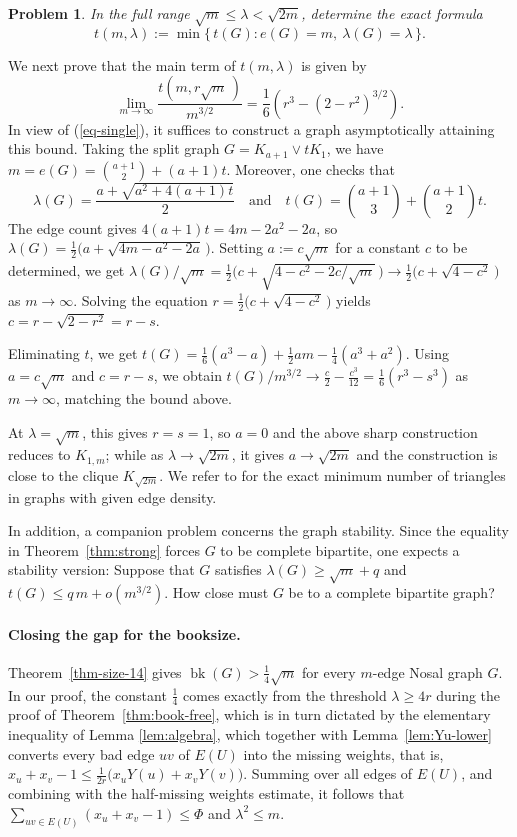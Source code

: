 \documentclass[11pt,a4paper]{article}
\newtheorem{problem}[theorem]{Problem}
\theoremstyle{definition}
\theoremstyle{plain}
\newcommand{\bk}{\operatorname{bk}}
\renewcommand{\le}{\leqslant}
\renewcommand{\ge}{\geqslant}
\begin{document}
\begin{problem}
In the full range $\sqrt m\le\lambda<\sqrt{2m}$,
determine the exact formula
\[
   t(m,\lambda):=\min\bigl\{\,t(G):e(G)=m,\
   \lambda(G)=\lambda\,\bigr\}.
\]
\end{problem}

We next prove that the main term of $t(m,\lambda)$ is given by  
\[
   \lim_{m\to\infty}\frac{t(m,r\sqrt m\,)}{m^{3/2}}
   =\frac16 \left(r^3-(2-r^2)^{3/2}\right).
\] 
In view of (\ref{eq-single}), 
it suffices to construct a graph asymptotically
 attaining this bound. 
Taking the split graph $G=K_{a+1}\vee tK_1$, we have $m=e(G)=\binom{a+1}{2}+(a+1)t$. Moreover, 
one checks that 
\[
  \lambda (G)=\frac{a+\sqrt{a^2+4(a+1)t}}{2}\quad \text{and} \quad 
  t(G)=\binom{a\!+\!1}{3}+\binom{a\!+\!1}{2}t.
\]
The edge count gives
$4(a+1)t=4m-2a^2-2a$, so 
$ \lambda (G) =\frac{1}{2}\big(a+\sqrt{4m-a^2-2a}\, \big)$. Setting $a:=c\sqrt m$ for a constant $c$  to be determined, we get 
${\lambda(G)}/{\sqrt m} =\frac12\big(c+\sqrt{4-c^2 
-{2c}/\!{\sqrt m}}\, \big)
  \to \frac{1}{2} \big(c+\sqrt{4-c^2} \,\big)$ as $m\to \infty$. 
Solving the equation $r=\frac{1}{2}\big( c+\sqrt{4-c^2}\, \big)$ yields $c=r-\sqrt{2-r^2} =r-s$.  

Eliminating $t$, we get $t(G)=\frac{1}{6}(a^3 -a) + \frac{1}{2}am - \frac{1}{4}(a^3 +a^2)$. Using $a=c\sqrt{m}$ and $c=r-s$, we obtain $t(G)/ m^{3/2} \to \frac{c}{2} - \frac{c^3}{12} = \frac{1}{6}(r^3-s^3)$ as $m\to \infty$, matching the bound above. 

At $\lambda=\sqrt m$, this gives $r=s=1$, so $a=0$ and the above sharp construction reduces to $K_{1,m}$; while as $\lambda\to\sqrt{2m}$, it gives $a\to\sqrt{2m}$ and the construction is close to the clique $K_{\sqrt{2m}}$. We refer to
\cite{LPS2020} for the exact minimum number of
triangles in graphs with given edge density.

In addition, a companion problem concerns the graph 
stability. Since the equality in
Theorem~\ref{thm:strong} forces $G$ to be complete
bipartite, one expects a stability version: Suppose
that $G$ satisfies $\lambda(G)\ge\sqrt m+q$ and
$t(G)\le q\,m+o(m^{3/2})$. How close must $G$ be to a
complete bipartite graph? 


\paragraph{Closing the gap for the booksize.}
Theorem~\ref{thm-size-14} gives $\bk(G)>\tfrac14\sqrt m$ for every $m$-edge Nosal graph $G$. 
 In our proof, 
the constant $\tfrac14$ comes exactly from  the threshold $\lambda\ge 4r$ during the proof of Theorem~\ref{thm:book-free}, which is in turn dictated by the elementary inequality of Lemma \ref{lem:algebra}, which together with Lemma~\ref{lem:Yu-lower} converts every bad edge $uv$ of $E(U)$ into the missing weights, that is, $x_u+x_v-1\le \frac{1}{2r}\big( x_uY(u)+x_vY(v) \big)$. 
Summing over all edges of $E(U)$, and combining with the half-missing weights estimate, it follows that $\sum_{uv\in E(U)} (x_u+x_v -1)\le \Phi$ and $\lambda^2 \le m$. 
\end{document}
